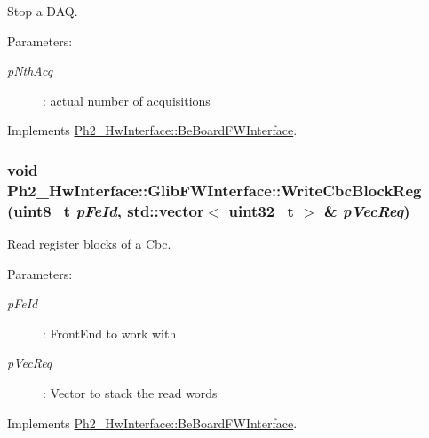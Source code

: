 Stop a DAQ. 

\begin{Desc}
\item[Parameters:]
\begin{description}
\item[{\em p\-Nth\-Acq}]: actual number of acquisitions \end{description}
\end{Desc}


Implements \hyperlink{class_ph2___hw_interface_1_1_be_board_f_w_interface_34c0dc403995e843eccbb82dd73f5b51}{Ph2\_\-Hw\-Interface::Be\-Board\-FWInterface}.\hypertarget{class_ph2___hw_interface_1_1_glib_f_w_interface_2bc165eebeab754425dcbffb21aa2717}{
\subsubsection[WriteCbcBlockReg]{\setlength{\rightskip}{0pt plus 5cm}void Ph2\_\-Hw\-Interface::Glib\-FWInterface::Write\-Cbc\-Block\-Reg (uint8\_\-t {\em p\-Fe\-Id}, std::vector$<$ uint32\_\-t $>$ \& {\em p\-Vec\-Req})}}
\label{class_ph2___hw_interface_1_1_glib_f_w_interface_2bc165eebeab754425dcbffb21aa2717}


Read register blocks of a Cbc. 

\begin{Desc}
\item[Parameters:]
\begin{description}
\item[{\em p\-Fe\-Id}]: Front\-End to work with \item[{\em p\-Vec\-Req}]: Vector to stack the read words \end{description}
\end{Desc}


Implements \hyperlink{class_ph2___hw_interface_1_1_be_board_f_w_interface_9cc424d15f9f0fc310279377c2916654}{Ph2\_\-Hw\-Interface::Be\-Board\-FWInterface}.

